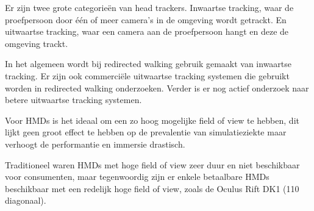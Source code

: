 Er zijn twee grote categorie\"en van head trackers. Inwaartse tracking, waar de
proefpersoon door \'e\'en of meer camera's in de omgeving wordt getrackt. En
uitwaartse tracking, waar een camera aan de proefpersoon hangt en deze de
omgeving trackt.

In het algemeen wordt bij redirected walking gebruik gemaakt van inwaartse 
tracking\cite{bruder08,engel08,steinicke09,kohn01,neth12,ward92}. Er zijn ook 
commerci\"ele uitwaartse tracking systemen die gebruikt worden in redirected
walking onderzoeken\cite{peck09,suma11}. Verder is er nog actief onderzoek naar
betere uitwaartse tracking systemen\cite{maesen13}.

Voor HMDs is het ideaal om een zo hoog mogelijke field of view te hebben, dit
lijkt geen groot effect te hebben op de prevalentie van 
simulatieziekte\cite{arthur00} maar verhoogt de performantie en immersie
drastisch\cite{arthur00}.

Traditioneel waren HMDs met hoge field of view zeer duur en niet beschikbaar voor
consumenten, maar tegenwoordig zijn er enkele betaalbare HMDs beschikbaar met een
redelijk hoge field of view, zoals de Oculus Rift DK1 (110\textdegree{} 
diagonaal).